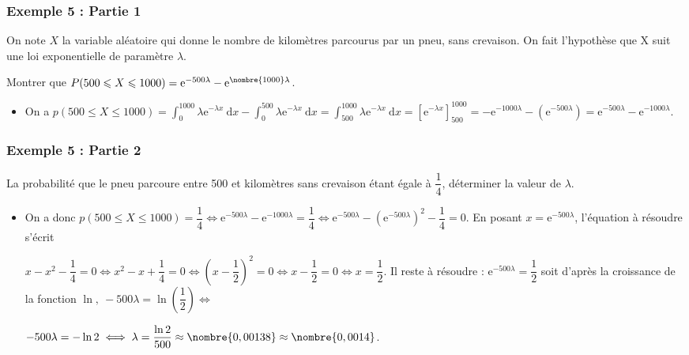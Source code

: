 \documentclass[xcolor=svgnames,t,final]{beamer}
\begin{document}
\begin{frame}

\frametitle{Exemple 5 : Partie 1}

On note $X$ la variable aléatoire qui donne le nombre de kilomètres parcourus par un pneu, sans crevaison. On fait l'hypothèse que X suit une loi exponentielle de paramètre $\lambda$.

Montrer que $P(500\leqslant X\leqslant 1000) =\mathrm{e}^{-500\lambda}-\mathrm{e}^{\nombre{1000}\lambda}$.

\begin{itemize}

\pause \item 
On a $p(500 \leqslant X \leqslant 1000) = \displaystyle\int_{0}^{1000}\lambda\mathrm{e}^{-\lambda x}\:\text{d}x - \displaystyle\int_{0}^{500}\lambda\mathrm{e}^{-\lambda x}\:\text{d}x = \displaystyle\int_{500}^{1000}\lambda\mathrm{e}^{-\lambda x}\:\text{d}x = \left[\text{e}^{-\lambda x} \right]_{500}^{1000} = - \text{e}^{-1000\lambda} - \left(\text{e}^{-500\lambda} \right) = \text{e}^{-500\lambda} - \text{e}^{-1000\lambda}$.

\end{itemize}



\end{frame}


\begin{frame}

\frametitle{Exemple 5 : Partie 2}

La probabilité que le pneu parcoure entre 500 et  kilomètres sans crevaison étant égale à $\dfrac{1}{4}$, déterminer la valeur de $\lambda$.

\begin{itemize}

\pause \item 
On a donc $p(500 \leqslant X \leqslant 1000) = \dfrac{1}{4} \iff \text{e}^{-500\lambda} - \text{e}^{-1000\lambda} = \dfrac{1}{4} \iff \text{e}^{-500\lambda} - \left(\text{e}^{-500\lambda} \right)^2 - \dfrac{1}{4} = 0$.
En posant $x = \text{e}^{-500\lambda}$, l'équation à résoudre s'écrit 

$x - x^2 - \dfrac{1}{4} = 0 \iff x^2 - x + \dfrac{1}{4} = 0 \iff \left(x - \dfrac{1}{2} \right)^2  = 0 \iff x - \dfrac{1}{2} = 0 \iff x = \dfrac{1}{2}$.
Il reste à résoudre :
$\text{e}^{-500\lambda} = \dfrac{1}{2}$ soit d'après la croissance de la fonction $\ln,\: -500\lambda = \ln \left(\dfrac{1}{2}\right) \iff $

$-500\lambda = - \ln 2 \iff \lambda = \dfrac{\ln 2}{500}\approx \nombre{0,00138} \approx \nombre{0,0014}$.

\end{itemize}



\end{frame}
\end{document}
